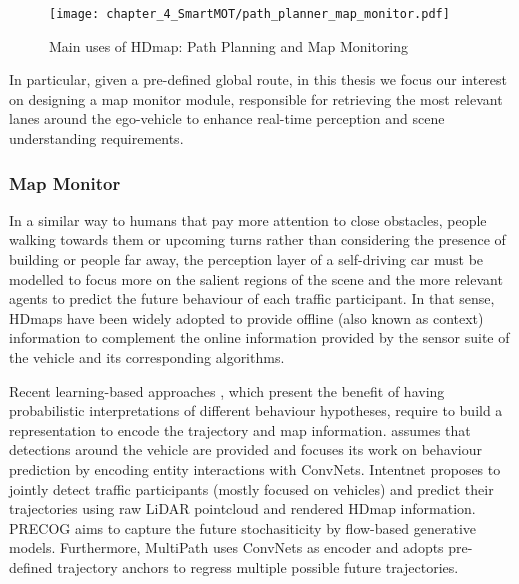 \begin{figure}[] 
	\centering
	\texttt{[image: chapter\_4\_SmartMOT/path\_planner\_map\_monitor.pdf]}
	\caption{Main uses of \ac{HDmap}: Path Planning and Map Monitoring}
	\label{fig:chapter_4_SmartMOT/path_planner_map_monitor}
\end{figure}

In particular, given a pre-defined global route, in this thesis we focus our interest on designing a map monitor module, responsible for retrieving the most relevant lanes around the ego-vehicle to enhance real-time perception and scene understanding requirements.

\subsubsection{Map Monitor}
\label{subsubsec:4_smartmot_mapmonitor}

In a similar way to humans that pay more attention to close obstacles, people walking towards them or upcoming turns rather than considering the presence of building or people far away, the perception layer of a self-driving car must be modelled to focus more on the salient regions of the scene \cite{sadeghian2019sophie} and the more relevant agents to predict the future behaviour of each traffic participant. In that sense, \acp{HDmap} have been widely adopted to provide offline (also known as context) information to complement the online information provided by the sensor suite of the vehicle and its corresponding algorithms. 

Recent learning-based approaches \cite{hong2019rules} \cite{chai2019multipath} \cite{gao2020vectornet} \cite{casas2018intentnet}, which present the benefit of having probabilistic interpretations of different behaviour hypotheses, require to build a representation to encode the trajectory and map information. \cite{hong2019rules} assumes that detections around the vehicle are provided and focuses its work on behaviour prediction by encoding entity interactions with ConvNets. Intentnet \cite{casas2018intentnet} proposes to jointly detect traffic participants (mostly focused on vehicles) and predict their trajectories using raw LiDAR pointcloud and rendered \ac{HDmap} information. PRECOG \cite{rhinehart2019precog} aims to capture the future stochasiticity by flow-based generative models. Furthermore, MultiPath \cite{chai2019multipath} uses ConvNets as encoder and adopts pre-defined trajectory anchors to regress multiple possible future trajectories. 

